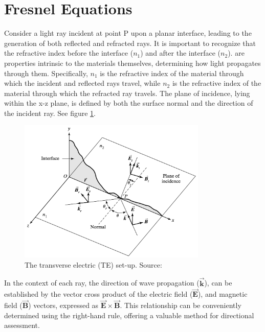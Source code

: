 \section{Fresnel Equations}
Consider a light ray incident at point P upon a planar interface, leading to the generation of both reflected and refracted rays. It is important to recognize that the refractive index before the interface ($n_1$) and after the interface ($n_2$). are properties intrinsic to the materials themselves, determining how light propagates through them. Specifically, $n_1$ is the refractive index of the material through which the incident and reflected rays travel, while $n_2$ is the refractive index of the material through which the refracted ray travels. The plane of incidence, lying within the x-z plane, is defined by both the surface normal and the direction of the incident ray. See figure \ref{fig:The TE Set-up}.

\begin{figure}[ht!]
  \centering
  \includegraphics[width=0.8\textwidth]{Chapters/Figures/Chapter 2 Figures/Incident, Reflected, and Transmitted Ray for TE Mode.png}
  \caption[The transverse electric (TE) set-up]{The transverse electric (TE) set-up. Source: \cite{pedrotti_introduction_2007}}
  \label{fig:The TE Set-up}
\end{figure}

In the context of each ray, the direction of wave propagation ($\vec{\mathbf{k}}$), can be established by the vector cross product of the electric field ($\vec{\mathbf{E}}$), and magnetic field ($\vec{\mathbf{B}}$) vectors, expressed as $\vec{\mathbf{E}} \times \vec{\mathbf{B}}$. This relationship can be conveniently determined using the right-hand rule, offering a valuable method for directional assessment.

